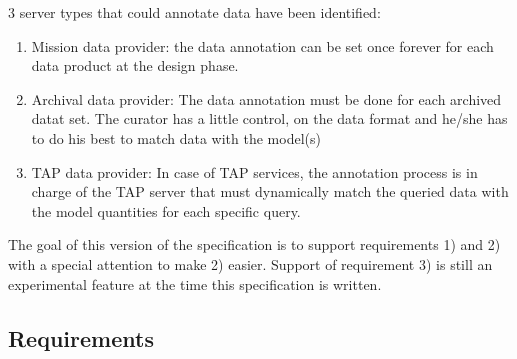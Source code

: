\documentclass[11pt,a4paper]{ivoa}
\begin{document}
3 server types that could annotate data have been identified:
\begin{enumerate}
   \item Mission data provider: the data annotation can be set once forever for each data product at the design phase.
   \item Archival data provider: The data annotation must be done for each archived datat set. The curator has a little control, on the data format and he/she has to do his best to match data with the model(s) 
   \item  TAP data provider: In case of TAP services, the annotation process is in charge of the TAP server that must dynamically  match the queried data with the model quantities for each specific query.
\end{enumerate}

The goal of this version of the specification is to support requirements 1) and 2) with a special attention to make 2) easier. Support of requirement 3) is still an experimental feature at the time this specification is written.


\subsection{Requirements}
\end{document}
